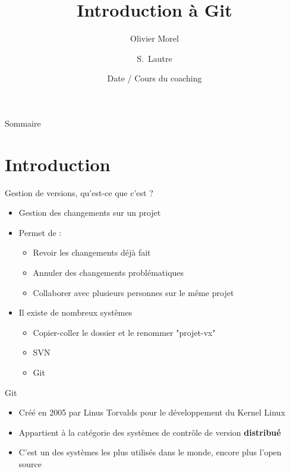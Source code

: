 \documentclass{beamer}
\title{Introduction à Git}
\author
{Olivier Morel \and S.~Lautre}
\date[Version courte]
{Date / Cours du coaching}
\begin{document}
\begin{frame}
	\titlepage
\end{frame}


\begin{frame}{Sommaire}
	\tableofcontents
\end{frame}

\section{Introduction}

\begin{frame}{Gestion de versions, qu'est-ce que c'est ?}
	\begin{itemize}
		\item Gestion des changements sur un projet
		\item Permet de :
			\begin{itemize}
				\item Revoir les changements déjà fait
				
				\item Annuler des changements problématiques
				\item Collaborer avec plusieurs personnes sur le même projet
			\end{itemize}
		\item Il existe de nombreux systèmes
			\begin{itemize}
				\item Copier-coller le dossier et le renommer "projet-vx"
				\item SVN
				\item Git
			\end{itemize}
	\end{itemize}
\end{frame}
	
\begin{frame}{Git}
	\begin{itemize}
		\item Créé en 2005 par Linus Torvalds pour le développement du Kernel Linux
		\item Appartient à la catégorie des systèmes de contrôle de version \textbf{distribué}
		\item C'est un des systèmes les plus utilisés dans le monde, encore plus l'open source
	\end{itemize}
\end{frame}
\end{document}
